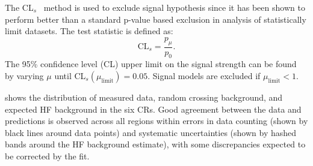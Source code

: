 The CL$_{s}$~\cite{Read_2002} method is used to exclude signal hypothesis since it has been shown to perform better than a standard p-value based exclusion in analysis of statistically limit datasets. The test statistic is defined as:
\begin{equation}
    \mathrm{CL}_s = \frac{p_\mu}{p_0}.
\end{equation}
The 95\% confidence level (CL) upper limit on the signal strength can be found by varying $\mu$ until CL$_s (\mu_\mathrm{limit})=0.05$. Signal models are excluded if $\mu_{\mathrm{limit}} < 1$.

 shows the \mdv distribution of measured data, random crossing background, and expected HF background in the six CRs. Good agreement between the data and predictions is observed across all regions within errors in data counting (shown by black lines around data points) and systematic uncertainties (shown by hashed bands around the HF background estimate), with some discrepancies expected to be corrected by the fit.

